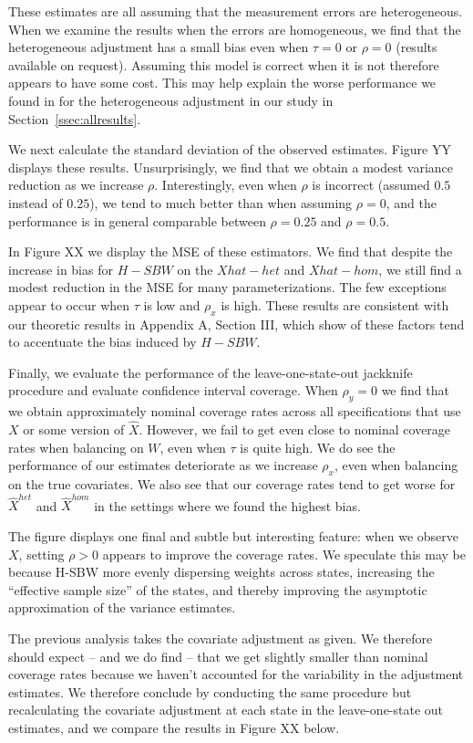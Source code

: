 These estimates are all assuming that the measurement errors are heterogeneous. When we examine the results when the errors are homogeneous, we find that the heterogeneous adjustment has a small bias even when $\tau = 0$ or $\rho = 0$ (results available on request). Assuming this model is correct when it is not therefore appears to have some cost. This may help explain the worse performance we found in for the heterogeneous adjustment in our study in Section~\ref{ssec:allresults}.

We next calculate the standard deviation of the observed estimates. Figure YY displays these results. Unsurprisingly, we find that we obtain a modest variance reduction as we increase $\rho$. Interestingly, even when $\rho$ is incorrect (assumed $0.5$ instead of $0.25$), we tend to much better than when assuming $\rho = 0$, and the performance is in general comparable between $\rho = 0.25$ and $\rho = 0.5$.

In Figure XX we display the MSE of these estimators. We find that despite the increase in bias for $H-SBW$ on the $Xhat-het$ and $Xhat-hom$, we still find a modest reduction in the MSE for many parameterizations. The few exceptions appear to occur when $\tau$ is low and $\rho_x$ is high. These results are consistent with our theoretic results in Appendix A, Section III, which show of these factors tend to accentuate the bias induced by $H-SBW$.

Finally, we evaluate the performance of the leave-one-state-out jackknife procedure and evaluate confidence interval coverage. When $\rho_y = 0$ we find that we obtain approximately nominal coverage rates across all specifications that use $X$ or some version of $\hat{X}$. However, we fail to get even close to nominal coverage rates when balancing on $W$, even when $\tau$ is quite high. We do see the performance of our estimates deteriorate as we increase $\rho_x$, even when balancing on the true covariates. We also see that our coverage rates tend to get worse for $\hat{X}^{het}$ and $\hat{X}^{hom}$ in the settings where we found the highest bias.

The figure displays one final and subtle but interesting feature: when we observe $X$, setting $\rho > 0$ appears to improve the coverage rates. We speculate this may be because H-SBW more evenly dispersing weights across states, increasing the ``effective sample size'' of the states, and thereby improving the asymptotic approximation of the variance estimates. 

The previous analysis takes the covariate adjustment as given. We therefore should expect -- and we do find -- that we get slightly smaller than nominal coverage rates because we haven't accounted for the variability in the adjustment estimates. We therefore conclude by conducting the same procedure but recalculating the covariate adjustment at each state in the leave-one-state out estimates, and we compare the results in Figure XX below.

